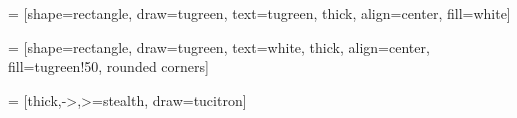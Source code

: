 



 = [shape=rectangle, draw=tugreen, text=tugreen, thick, 
	align=center, fill=white]

 = [shape=rectangle, draw=tugreen, text=white, thick, 
	align=center, fill=tugreen!50, rounded corners]



 = [thick,->,>=stealth, draw=tucitron]
